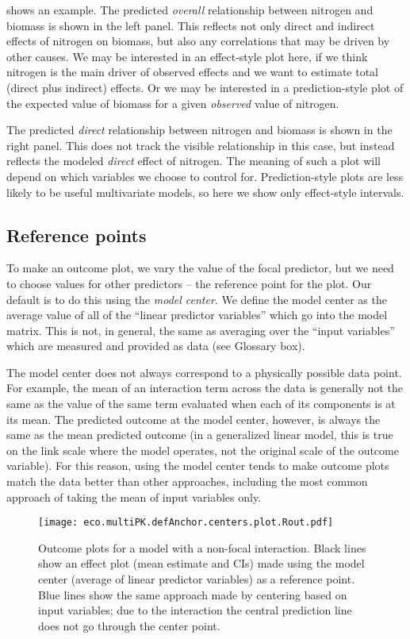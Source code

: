  shows an example. The predicted \emph{overall} relationship between nitrogen and biomass is shown in the left panel. This reflects not only direct and indirect effects of nitrogen on biomass, but also any correlations that may be driven by other causes. We may be interested in an effect-style plot here, if we think nitrogen is the main driver of observed effects and we want to estimate total (direct plus indirect) effects. Or we may be interested in a prediction-style plot of the expected value of biomass for a given \emph{observed} value of nitrogen.

The predicted \emph{direct} relationship between nitrogen and biomass is shown in the right panel. This does not track the visible relationship in this case, but instead reflects the modeled \emph{direct} effect of nitrogen. The meaning of such a plot will depend on which variables we choose to control for. Prediction-style plots are less likely to be useful multivariate models, so here we show only effect-style intervals.

\subsection{Reference points}

To make an outcome plot, we vary the value of the focal predictor, but we need to choose values for other predictors -- the reference point for the plot. Our default is to do this using the \emph{model center}. We define the model center as the average value of all of the “linear predictor variables” which go into the model matrix. This is not, in general, the same as averaging over the “input variables” which are measured and provided as data (see Glossary box). 

The model center does not always correspond to a physically possible data point. For example, the mean of an interaction term across the data is generally not the same as the value of the same term evaluated when each of its components is at its mean. The predicted outcome at the model center, however, is always the same as the mean predicted outcome (in a generalized linear model, this is true on the link scale where the model operates, not the original scale of the outcome variable). For this reason, using the model center tends to make outcome plots match the data better than other approaches, including the most common approach of taking the mean of input variables only.

\begin{figure}
\begin{center}
\texttt{[image: eco.multiPK.defAnchor.centers.plot.Rout.pdf]}
\end{center}
\caption{Outcome plots for a model with a non-focal interaction. Black lines show an effect plot (mean estimate and CIs) made using the model center (average of linear predictor variables) as a reference point. Blue lines show the same approach made by centering based on input variables; due to the interaction the central prediction line does not go through the center point.}
\end{figure}

